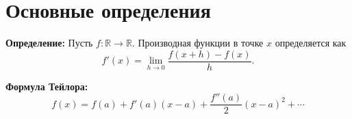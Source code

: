 \documentclass[12pt, a4paper]{article}
\begin{document}
\section*{Основные определения}

\textbf{Определение:} Пусть \( f: \mathbb{R} \to \mathbb{R} \). Производная функции в точке \( x \) определяется как
\[
f'(x) = \lim_{h \to 0} \frac{f(x+h) - f(x)}{h}.
\]

\textbf{Формула Тейлора:}
\[
f(x) = f(a) + f'(a)(x - a) + \frac{f''(a)}{2}(x - a)^2 + \cdots
\]
\end{document}
